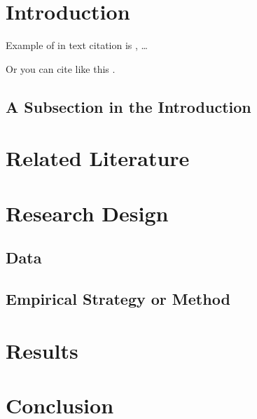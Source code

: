 \documentclass[
  11pt,
]{article}
\begin{document}
\vskip -8.5pt




\setlength{\parindent}{16pt}
\setlength{\parskip}{0pt}

\hypertarget{introduction}{%
\section{Introduction}\label{introduction}}

Example of in text citation is \citet{king2001}, \ldots{}

Or you can cite like this \citep{king2001}.

\hypertarget{a-subsection-in-the-introduction}{%
\subsection{A Subsection in the
Introduction}\label{a-subsection-in-the-introduction}}

\kant[2]

\hypertarget{related-literature}{%
\section{Related Literature}\label{related-literature}}

\hypertarget{research-design}{%
\section{Research Design}\label{research-design}}

\hypertarget{data}{%
\subsection{Data}\label{data}}

\hypertarget{empirical-strategy-or-method}{%
\subsection{Empirical Strategy or
Method}\label{empirical-strategy-or-method}}

\hypertarget{results}{%
\section{Results}\label{results}}

\hypertarget{conclusion}{%
\section{Conclusion}\label{conclusion}}
\end{document}
